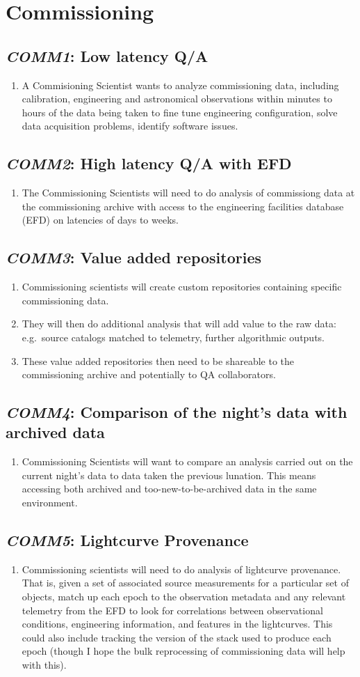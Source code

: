 \documentclass[DM,toc,lsstdraft]{lsstdoc}
\newcommand{\usecase}[3]{%
\subsection{\emph{#1}: #2}
\begin{enumerate}[label=\alph*.]
#3
\end{enumerate}
}
\begin{document}
\section{Commissioning}

\usecase{COMM1}{Low latency Q/A}{%

\item
A Commisioning Scientist wants to analyze commissioning data, including calibration, engineering and astronomical observations within minutes to hours of the data being taken to fine tune engineering configuration, solve data acquisition problems, identify software issues.

}

\usecase{COMM2}{High latency Q/A with EFD}{%

\item
The Commissioning Scientists will need to do analysis of commissiong data at the commissioning archive with access to the engineering facilities database (EFD) on latencies of days to weeks.

}

\usecase{COMM3}{Value added repositories}{%

\item
Commissioning scientists will create custom repositories containing specific commissioning data.

\item
They will then do additional analysis that will add value to the raw data: e.g.\ source catalogs matched to telemetry, further algorithmic outputs.

\item
These value added repositories then need to be shareable to the commissioning archive and potentially to QA collaborators.

}

\usecase{COMM4}{Comparison of the night's data with archived data}{%

\item
Commissioning Scientists will want to compare an analysis carried out on the current night's data to data taken the previous lunation.
This means accessing both archived and too-new-to-be-archived data in the same environment.

}

\usecase{COMM5}{Lightcurve Provenance}{%

\item
Commissioning scientists will need to do analysis of lightcurve provenance.
That is, given a set of associated source measurements for a particular set of objects, match up each epoch to the observation metadata and any relevant telemetry from the EFD to look for correlations between observational conditions, engineering information, and features in the lightcurves.
This could also include tracking the version of the stack used to produce each epoch (though I hope the bulk reprocessing of commissioning data will help with this).

}
\end{document}
